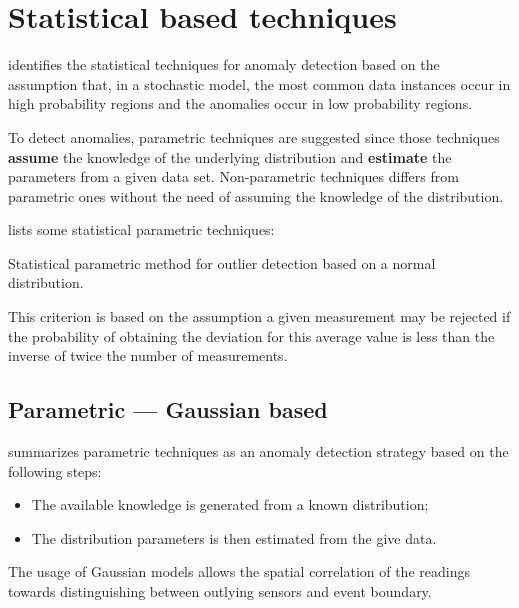 \newpage

\section{Statistical based techniques}
\label{sec:statbased}



\cite{gen:chandola:2009} identifies the statistical techniques for anomaly detection based on the assumption that, in a stochastic model, the most common data instances occur in high probability regions and the anomalies occur in low probability regions.

To detect anomalies, parametric techniques are suggested since those techniques \textbf{assume} the knowledge of the underlying distribution and \textbf{estimate} the parameters from a given data set. Non-parametric techniques differs from parametric ones without the need of assuming the knowledge of the distribution.

\cite{cluster:andrade2016} lists some statistical parametric techniques: 

\begin{description}
	\setlength\itemsep{-0.5em}
	\item[Peirce's Criterion]  
	Statistical parametric method for outlier detection based on a normal distribution.
	\item[Chauvenet's Criterion]  
	This criterion is based on the assumption a given measurement may
	be rejected if the probability of obtaining the deviation for this average value is less than the inverse of twice the number of measurements.
\end{description}

\subsection{Parametric --- Gaussian based}
\cite{gen:zhang:2010} summarizes parametric techniques as an anomaly detection strategy based on the following steps:

\begin{itemize}
	\setlength\itemsep{-0.5em}
	\item The available knowledge is generated from a known distribution;
	\item The distribution parameters is then estimated from the give data.	
\end{itemize}

The usage of Gaussian  models allows the spatial correlation of the readings towards distinguishing between outlying sensors and event boundary. 

